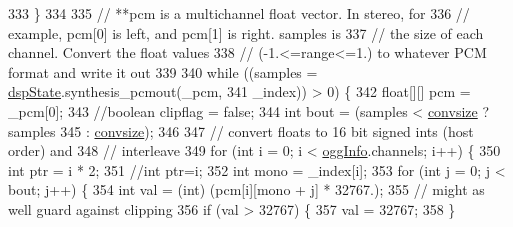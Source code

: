 \begin{DoxyCode}
333                                 \}
334 
335                                 \textcolor{comment}{// **pcm is a multichannel float vector.  In stereo, for}
336                                 \textcolor{comment}{// example, pcm[0] is left, and pcm[1] is right.  samples is}
337                                 \textcolor{comment}{// the size of each channel.  Convert the float values}
338                                 \textcolor{comment}{// (-1.<=range<=1.) to whatever PCM format and write it out}
339 
340                                 \textcolor{keywordflow}{while} ((samples = \mbox{\hyperlink{classorg_1_1newdawn_1_1slick_1_1openal_1_1_ogg_input_stream_aaa29998e4b4c69e6fba08f5ea5764d15}{dspState}}.synthesis\_pcmout(\_pcm,
341                                         \_index)) > 0) \{
342                                     \textcolor{keywordtype}{float}[][] pcm = \_pcm[0];
343                                     \textcolor{comment}{//boolean clipflag = false;}
344                                     \textcolor{keywordtype}{int} bout = (samples < \mbox{\hyperlink{classorg_1_1newdawn_1_1slick_1_1openal_1_1_ogg_input_stream_a4164d082fa5f390c0297501481e4db36}{convsize}} ? samples
345                                             : \mbox{\hyperlink{classorg_1_1newdawn_1_1slick_1_1openal_1_1_ogg_input_stream_a4164d082fa5f390c0297501481e4db36}{convsize}});
346 
347                                     \textcolor{comment}{// convert floats to 16 bit signed ints (host order) and}
348                                     \textcolor{comment}{// interleave}
349                                     \textcolor{keywordflow}{for} (\textcolor{keywordtype}{int} i = 0; i < \mbox{\hyperlink{classorg_1_1newdawn_1_1slick_1_1openal_1_1_ogg_input_stream_a21aa37c5c0611a79132c4d76fbefe460}{oggInfo}}.channels; i++) \{
350                                         \textcolor{keywordtype}{int} ptr = i * 2;
351                                         \textcolor{comment}{//int ptr=i;}
352                                         \textcolor{keywordtype}{int} mono = \_index[i];
353                                         \textcolor{keywordflow}{for} (\textcolor{keywordtype}{int} j = 0; j < bout; j++) \{
354                                             \textcolor{keywordtype}{int} val = (int) (pcm[i][mono + j] * 32767.);
355                                             \textcolor{comment}{// might as well guard against clipping}
356                                             \textcolor{keywordflow}{if} (val > 32767) \{
357                                                 val = 32767;
358                                             \}

\end{DoxyCode}
